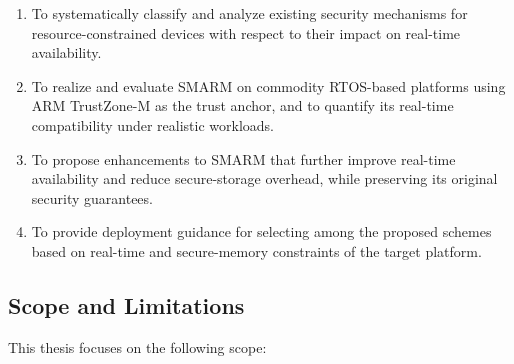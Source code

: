 \documentclass[a4paper,10pt]{article}
\begin{document}
\begin{enumerate}
    \item To systematically classify and analyze existing security
    mechanisms for resource-constrained devices with respect to their
    impact on real-time availability.
    
    \item To realize and evaluate SMARM on commodity RTOS-based platforms
    using ARM TrustZone-M as the trust anchor, and to quantify its
    real-time compatibility under realistic workloads.
    
    \item To propose enhancements to SMARM that further improve real-time
    availability and reduce secure-storage overhead, while preserving
    its original security guarantees.
    
    \item To provide deployment guidance for selecting among the proposed
    schemes based on real-time and secure-memory constraints of the
    target platform.
\end{enumerate}


\subsection{Scope and Limitations}

This thesis focuses on the following scope:
\end{document}
